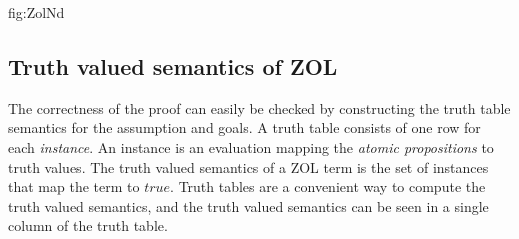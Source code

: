  {fig:ZolNd}



\subsection{Truth valued semantics of ZOL}
  The correctness of the   proof  can easily be checked by constructing the truth table semantics for the assumption and goals. A truth table consists of one row for each \emph{instance}. An instance is an evaluation mapping the \emph{atomic propositions} to truth values. The truth valued semantics of a ZOL term is the set of  instances that map the term to $true$.   Truth tables are a convenient  way to compute the  truth valued semantics, and the  truth valued semantics can be seen in a single column of the truth table.
  
